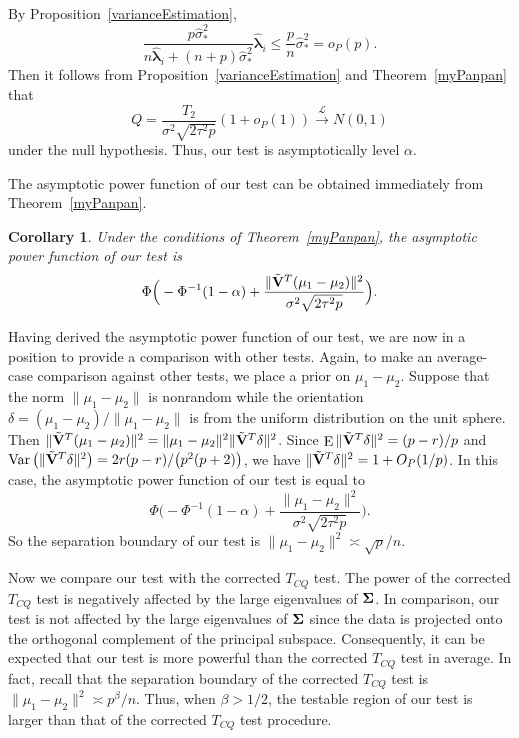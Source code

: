 \documentclass[review]{elsarticle}
\DeclareMathOperator{\myE}{E}
\DeclareMathOperator{\myVar}{Var}
\newcommand{\bfsym}[1]{\ensuremath{\boldsymbol{#1}}}
\def\blambda {\bfsym {\lambda}}        \def\bLambda {\bfsym {\Lambda}}
\theoremstyle{plain}
\newtheorem{corollary}{\quad\quad Corollary}
\theoremstyle{definition}
\theoremstyle{remark}
\begin{document}
By Proposition~\ref{varianceEstimation},
$$
\frac{p\hat{\sigma}_*^2}{n\hat{\blambda}_i+(n+p)\hat{\sigma}_*^2}\hat{\blambda}_i\leq
\frac{p}{n}\hat{\sigma}_*^2
=o_P(p).
$$
Then it follows from Proposition~\ref{varianceEstimation} and Theorem~\ref{myPanpan} that
$$
Q=\frac{T_2}{\sigma^2\sqrt{2\tau^2 p}}(1+o_P(1))\xrightarrow{\mathcal{L}}N(0,1)
$$
under the null hypothesis.
Thus, our test is asymptotically level $\alpha$.

The asymptotic power function of our test can be obtained immediately from Theorem~\ref{myPanpan}.
\begin{corollary}\label{testPowerh}
    Under the conditions of Theorem~\ref{myPanpan}, the asymptotic power function of our test is
    \begin{equation*}
        \Phi\Big(-\Phi^{-1}(1-\alpha)+\frac{\|\tilde{\mathbf{V}}^T(\mu_1-\mu_2)\|^2}{\sigma^2\sqrt{2\tau^2p}}\Big).
    \end{equation*}
\end{corollary}

Having derived the asymptotic power function of our test, we are now in a position to provide a comparison with other tests.
Again, to make an average-case comparison against other tests, we place a prior on $\mu_1-\mu_2$.
Suppose that the norm $\|\mu_1-\mu_2\|$ is nonrandom while the orientation $\delta=(\mu_1-\mu_2)/\|\mu_1-\mu_2\|$ is from the uniform distribution on the unit sphere.
Then $\|\tilde{\mathbf{V}}^T(\mu_1-\mu_2)\|^2=\|\mu_1-\mu_2\|^2 \|\tilde{\mathbf{V}}^T\delta\|^2$.
Since $\myE \|\tilde{\BV}^T\delta\|^2=(p-r)/p$ and $\myVar \big(\|\tilde{\BV}^T\delta\|^2\big) = 2r(p-r)/\big(p^2(p+2)\big)$, we have $\|\tilde{\mathbf{V}}^T\delta\|^2=1+O_P(1/p)$.
In this case, the asymptotic power function of our test is equal to
    \begin{equation*}
        \Phi\Big(-\Phi^{-1}(1-\alpha)+\frac{\|\mu_1-\mu_2\|^2}{\sigma^2\sqrt{2\tau^2p}}\Big).
    \end{equation*}
So the separation boundary of our test is $\|\mu_1-\mu_2\|^2\asymp \sqrt{p}/n$.

Now we compare our test with the corrected $T_{CQ}$ test.
The power of the corrected $T_{CQ}$ test is negatively affected by the large eigenvalues of $\bSigma$.
In comparison, our test is not affected by the large eigenvalues of $\bSigma$ since the data is projected onto the orthogonal complement of the principal subspace.
Consequently, it can be expected that our test is more powerful than the corrected $T_{CQ}$ test in average.
In fact, recall that the separation boundary of the corrected $T_{CQ}$ test is $\|\mu_1-\mu_2\|^2\asymp p^{\beta}/n$.
 Thus, when $\beta>1/2$, the testable region of our test is larger than that of the corrected $T_{CQ}$ test procedure.
\end{document}
